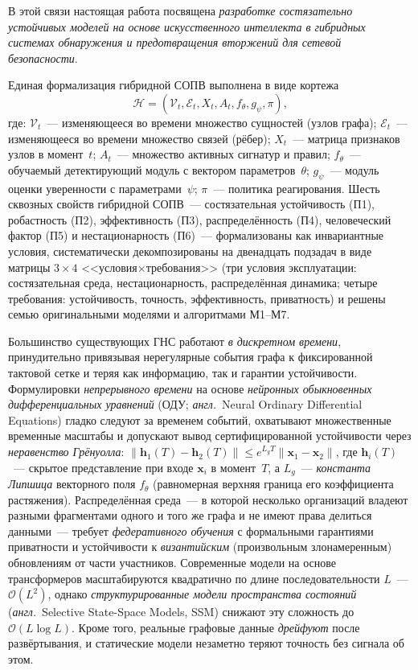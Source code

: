 \documentclass[12pt,a5paper]{article}
\begin{document}
В этой связи настоящая работа посвящена \emph{разработке
состязательно устойчивых моделей на основе искусственного
интеллекта в гибридных системах обнаружения и предотвращения
вторжений для сетевой безопасности}.

Единая формализация гибридной СОПВ выполнена в виде кортежа
\[
\mathcal{H} = (\mathcal{V}_t, \mathcal{E}_t, X_t, A_t,
f_\theta, g_\psi, \pi),
\]
где: $\mathcal{V}_t$~--- изменяющееся во времени множество
сущностей (узлов графа); $\mathcal{E}_t$~--- изменяющееся
во времени множество связей (рёбер); $X_t$~--- матрица
признаков узлов в момент~$t$; $A_t$~--- множество активных
сигнатур и правил; $f_\theta$~--- обучаемый детектирующий
модуль с вектором параметров~$\theta$; $g_\psi$~--- модуль
оценки уверенности с параметрами~$\psi$; $\pi$~--- политика
реагирования. Шесть сквозных свойств гибридной СОПВ~---
состязательная устойчивость (П1), робастность (П2),
эффективность (П3), распределённость (П4), человеческий
фактор (П5) и нестационарность (П6)~--- формализованы как
инвариантные условия, систематически декомпозированы на
двенадцать подзадач в виде матрицы $3\times4$
<<условия$\times$требования>> (три условия эксплуатации:
состязательная среда, нестационарность, распределённая
динамика; четыре требования: устойчивость, точность,
эффективность, приватность) и решены семью оригинальными
моделями и алгоритмами М1--М7.

Большинство существующих ГНС работают \emph{в дискретном
времени}, принудительно привязывая нерегулярные события
графа к фиксированной тактовой сетке и теряя как информацию,
так и гарантии устойчивости. Формулировки \emph{непрерывного
времени} на основе \emph{нейронных обыкновенных
дифференциальных уравнений}
(ОДУ; \emph{англ.}~Neural Ordinary Differential Equations)
гладко следуют за временем событий, охватывают множественные
временные масштабы и допускают вывод сертифицированной
устойчивости через \emph{неравенство Грёнуолла}:
$\|\mathbf{h}_1(T)-\mathbf{h}_2(T)\|\le e^{L_g T}
\|\mathbf{x}_1-\mathbf{x}_2\|$,
где $\mathbf{h}_i(T)$~--- скрытое представление при входе
$\mathbf{x}_i$ в момент~$T$, а $L_g$~--- \emph{константа
Липшица} векторного поля $f_\theta$ (равномерная верхняя
граница его коэффициента растяжения). Распределённая
среда~--- в которой несколько организаций владеют разными
фрагментами одного и того же графа и не имеют права делиться
данными~--- требует \emph{федеративного обучения} с
формальными гарантиями приватности и устойчивости к
\emph{византийским} (произвольным злонамеренным) обновлениям
от части участников. Современные модели на основе
трансформеров масштабируются квадратично по длине
последовательности $L$~--- $\mathcal{O}(L^2)$, однако
\emph{структурированные модели пространства состояний}
(\emph{англ.}~Selective State-Space Models, SSM) снижают
эту сложность до $\mathcal{O}(L\log L)$. Кроме того,
реальные графовые данные \emph{дрейфуют} после развёртывания,
и статические модели незаметно теряют точность без
сигнала об этом.
\end{document}

